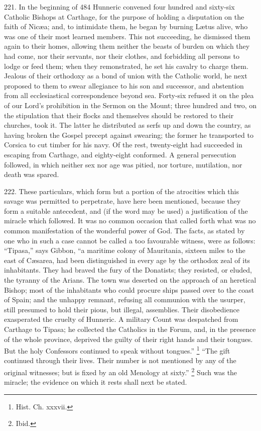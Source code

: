 221.
In the beginning of 484 Hunneric convened four hundred and sixty-six
Catholic Bishops at Carthage, for the purpose of holding a disputation
on the faith of Nicæa; and, to intimidate them, he began by burning Lætus
alive, who was one of their most learned members. This not succeeding,
he dismissed them again to their homes, allowing them neither the
beasts of burden on which they had come, nor their servants, nor their
clothes, and forbidding all persons to lodge or feed them; when they
remonstrated, he set his cavalry to charge them. Jealous of their
orthodoxy as a bond of union with the Catholic world, he next proposed
to them to swear allegiance to his son and successor, and abstention
from all ecclesiastical correspondence beyond sea. Forty-six refused
it on the plea of our Lord's prohibition in the Sermon on the Mount;
three hundred and two, on the stipulation that their flocks and
themselves should be restored to their churches, took it. The latter
he distributed as serfs up and down the country, as having broken the
Gospel precept against swearing; the former he transported to Corsica
to cut timber for his navy. Of the rest, twenty-eight had succeeded in
escaping from Carthage, and eighty-eight conformed. A general persecution followed, in which neither sex nor age was pitied, nor
torture, mutilation, nor death was spared.

222.
These particulars, which form but a portion of the atrocities which
this savage was permitted to perpetrate, have here been mentioned,
because they form a suitable antecedent, and (if the word may be used)
a justification of the miracle which followed. It was no common
occasion that called forth what was no common manifestation of the
wonderful power of God. The facts, as stated by one who in such a case
cannot be called a too favourable witness, were as follows: ``Tipasa,''
says Gibbon, ``a maritime colony of Mauritania, sixteen miles to the
east of Cæsarea, had been distinguished in every age by the orthodox
zeal of its inhabitants. They had braved the fury of the Donatists;
they resisted, or eluded, the tyranny of the Arians. The town was
deserted on the approach of an heretical Bishop; most of the
inhabitants who could procure ships passed over to the coast of Spain;
and the unhappy remnant, refusing all communion with the usurper,
still presumed to hold their pious, but illegal, assemblies. Their
disobedience exasperated the cruelty of Hunneric. A military Count was
despatched from Carthage to Tipasa; he collected the Catholics in the
Forum, and, in the presence of the whole province, deprived the guilty
of their right hands and their tongues. But the holy Confessors
continued to speak without tongues.'' \footnote{Hist. Ch. xxxvii.} ``The gift continued through their lives. Their number is not
mentioned by any of the original witnesses; but is fixed by an old
Menology at sixty.'' \footnote{Ibid.} Such
was the miracle; the evidence on which it rests shall next be stated.

